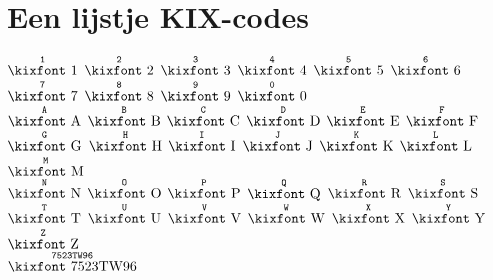 \documentclass{article}
\def\alnum#1{\ensuremath{\stackrel{\texttt{#1}}{\textrm{\kixfont #1}}}}
\def\spc{\mbox{\phantom{\kixfont A}}}
\begin{document}
\section*{Een lijstje KIX-codes}
\alnum 1\spc
\alnum 2\spc
\alnum 3\spc
\alnum 4\spc
\alnum 5\spc
\alnum 6\spc
\alnum 7\spc
\alnum 8\spc
\alnum 9\spc
\alnum 0\\

\alnum A\spc
\alnum B\spc
\alnum C\spc
\alnum D\spc
\alnum E\spc
\alnum F\spc
\alnum G\spc
\alnum H\spc
\alnum I\spc
\alnum J\spc
\alnum K\spc
\alnum L\spc
\alnum M\\

\alnum N\spc
\alnum O\spc
\alnum P\spc
\alnum Q\spc
\alnum R\spc
\alnum S\spc
\alnum T\spc
\alnum U\spc
\alnum V\spc
\alnum W\spc
\alnum X\spc
\alnum Y\spc
\alnum Z\\

\alnum {7523TW96}
\end{document}
